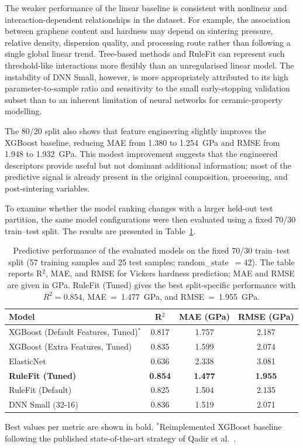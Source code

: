 \documentclass[pdflatex,sn-mathphys-num]{sn-jnl}%
\theoremstyle{thmstyleone}%
\theoremstyle{thmstyletwo}%
\theoremstyle{thmstylethree}%
\begin{document}
The weaker performance of the linear baseline is consistent with nonlinear and interaction-dependent relationships in the dataset. For example, the association between graphene content and hardness may depend on sintering pressure, relative density, dispersion quality, and processing route rather than following a single global linear trend. Tree-based methods and RuleFit can represent such threshold-like interactions more flexibly than an unregularised linear model. The instability of DNN Small, however, is more appropriately attributed to its high parameter-to-sample ratio and sensitivity to the small early-stopping validation subset than to an inherent limitation of neural networks for ceramic-property modelling.

The 80/20 split also shows that feature engineering slightly improves the XGBoost baseline, reducing MAE from 1.380 to 1.254~GPa and RMSE from 1.948 to 1.932~GPa. This modest improvement suggests that the engineered descriptors provide useful but not dominant additional information; most of the predictive signal is already present in the original composition, processing, and post-sintering variables.

To examine whether the model ranking changes with a larger held-out test partition, the same model configurations were then evaluated using a fixed 70/30 train--test split. The results are presented in Table~\ref{tab:70_30}.


\begin{table}[h]
\footnotesize
\centering
\renewcommand{\arraystretch}{1.4}
\caption{Predictive performance of the evaluated models on the fixed 70/30 train--test split (57 training samples and 25 test samples; random\_state~$= 42$). The table reports R$^2$, MAE, and RMSE for Vickers hardness prediction; MAE and RMSE are given in GPa. RuleFit (Tuned) gives the best split-specific performance with $R^2=0.854$, MAE~=~1.477~GPa, and RMSE~=~1.955~GPa.}
\label{tab:70_30}
\begin{tabular}{lccc}
\hline
\textbf{Model} & \textbf{R$^2$} & \textbf{MAE (GPa)} & \textbf{RMSE (GPa)} \\ \hline
XGBoost (Default Features, Tuned)$^{*}$  & 0.817 & 1.757 & 2.187 \\
XGBoost (Extra Features, Tuned)    & 0.835 & 1.599 & 2.074 \\
ElasticNet                         & 0.636 & 2.338 & 3.081 \\
\textbf{RuleFit (Tuned)}           & \textbf{0.854} & \textbf{1.477} & \textbf{1.955} \\
RuleFit (Default)                  & 0.825 & 1.504 & 2.135 \\
DNN Small (32-16)                  & 0.836 & 1.519 & 2.071 \\
\hline
\end{tabular}
\vspace{1mm}
\scriptsize{Best values per metric are shown in bold. $^{*}$Reimplemented XGBoost baseline following the published state-of-the-art strategy of Qadir et al.~\cite{qadir2024predicting}.}
\end{table}
\FloatBarrier
\end{document}
